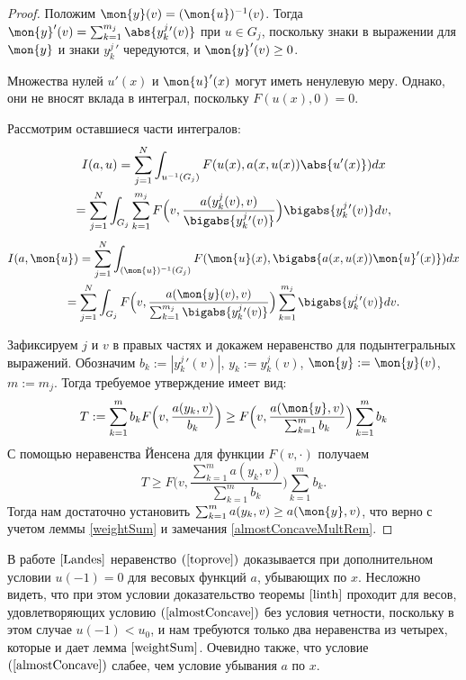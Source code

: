 \begin{proof}
Положим $\mon{y}(v) = (\mon{u})^{-1}(v)$.
Тогда $\mon{y}'(v) = \sum_{k=1}^{m_j} \abs{y_k^j{}'(v)}$ при $u \in G_j$, поскольку знаки в выражении для
$\mon{y}$ и знаки $y_k^j{}'$ чередуются, и $\mon{y}'(v)\ge 0$.

Множества нулей $u'(x)$ и $\mon{u}'(x)$ могут иметь ненулевую меру.
Однако, они не вносят вклада в интеграл, поскольку $F(u(x), 0) = 0$.

Рассмотрим оставшиеся части интегралов:
\begin{multline*}
I(a, u) = \sum_{j=1}^N \int_{u^{-1}(G_j)} F(u(x), a(x, u(x)) \abs{u'(x)}) dx
\\ = \sum_{j=1}^N \int_{G_j} \sum_{k=1}^{m_j} F\Big(v, \frac{a(y_k^j(v), v)}{\bigabs{y_k^j{}'(v)}}\Big) \bigabs{y_k^j{}'(v)} dv,
\end{multline*}
\begin{multline*}
I(a, \mon{u}) = \sum_{j=1}^N \int_{(\mon{u})^{-1}(G_j)} F(\mon{u}(x), \bigabs{a(x, u(x)) \mon{u}'(x)}) dx
\\ = \sum_{j=1}^N \int_{G_j} F\Big(v, \frac{a(\mon{y}(v), v)}{\sum_{k=1}^{m_j} \bigabs{y_k^j{}'(v)}}\Big)
\sum_{k=1}^{m_j} \bigabs{ y_k^j{}'(v) } dv.
\end{multline*}

Зафиксируем $j$ и $v$ в правых частях и докажем неравенство для подынтегральных выражений.
Обозначим $b_k := |y_k^j{}'(v)|$, $y_k := y_k^j(v)$, $\mon{y} := \mon{y}(v)$, $m := m_j$. Тогда
требуемое утверждение имеет вид:
$$T:=\sum_{k=1}^m b_k F\Big( v, \frac{ a(y_k, v) }{b_k} \Big) \ge F\Big( v, \frac{ a(\mon{y}, v) }{ \sum_{k=1}^m b_k  } \Big) \sum_{k=1}^m b_k$$
С помощью неравенства Йенсена для функции $F(v, \cdot)$ получаем
$$T \ge F\Big( v, \frac{ \sum_{k=1}^m a(y_k, v) }{ \sum_{k=1}^m b_k } \Big) \sum_{k=1}^m b_k.$$
Тогда нам достаточно установить $\sum_{k=1}^m a(y_k, v) \ge a(\mon{y}, v)$, что верно с учетом леммы \ref{weightSum} и замечания
\ref{almostConcaveMultRem}.
\end{proof}

\begin{rem}
\label{landesLinear}
В работе $\cite{Landes}$ неравенство $(\ref{toprove})$ доказывается при дополнительном условии $u(-1) = 0$
для весовых функций $a$, убывающих по $x$.
Несложно видеть, что при этом условии доказательство теоремы $\ref{linth}$ проходит для весов, удовлетворяющих условию
$(\ref{almostConcave})$ без условия четности,
поскольку в этом случае $u(-1) < u_0$, и нам требуются только два неравенства из четырех,
которые и дает лемма $\ref{weightSum}$.
Очевидно также, что условие $(\ref{almostConcave})$ слабее, чем условие убывания $a$ по $x$.
\end{rem}
